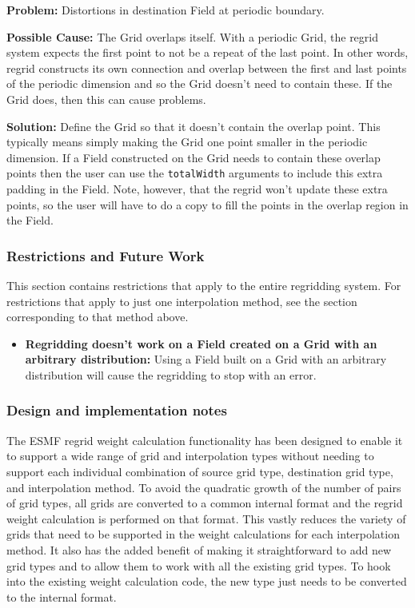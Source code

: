  \bigskip
 
 {\bf Problem:} Distortions in destination Field at periodic boundary.

 \medskip

 {\bf Possible Cause:} The Grid overlaps itself. With a periodic Grid, the regrid system expects
  the first point to not be a repeat of the last point. In other words,
  regrid constructs its own connection and overlap between the first and last points of the
  periodic dimension and so the Grid doesn't need to contain these. If the Grid does, then this
  can cause problems. 

 \smallskip

 {\bf Solution:} Define the Grid so that it doesn't contain the overlap point. This typically means simply making
 the Grid one point smaller in the periodic dimension.  If a Field 
 constructed on the Grid needs to contain these overlap points then the user can use the
 {\tt totalWidth} arguments to include this extra padding in the Field. Note, however, 
 that the regrid won't update these extra points, so the user will have to do a copy to fill the points
 in the overlap region in the Field.  

\subsubsection{Restrictions and Future Work}
This section contains restrictions that apply to the entire regridding system. For restrictions that apply to just one interpolation method, see the section corresponding to that method above.

\begin{itemize}

\item {\bf Regridding doesn't work on a Field created on a Grid with an arbitrary distribution:} Using a Field built on a Grid with an arbitrary distribution will cause the regridding to stop with an error.  

\end{itemize}

\subsubsection{Design and implementation notes}

The ESMF regrid weight calculation functionality has been designed to enable it to support a wide range
of grid and interpolation types without needing to support each individual combination of source grid type,
destination grid type, and interpolation method. To avoid the quadratic growth of the number of pairs
of grid types, all grids are converted to a common internal format and the regrid weight calculation
is performed on that format. This vastly reduces the variety of grids that need to be supported in 
the weight calculations for each interpolation method. It also has the added benefit of making it
straightforward to add new grid types and to allow them to work with all the existing grid types.
To hook into the existing weight calculation code, the new type just needs to be converted to the
internal format. 

